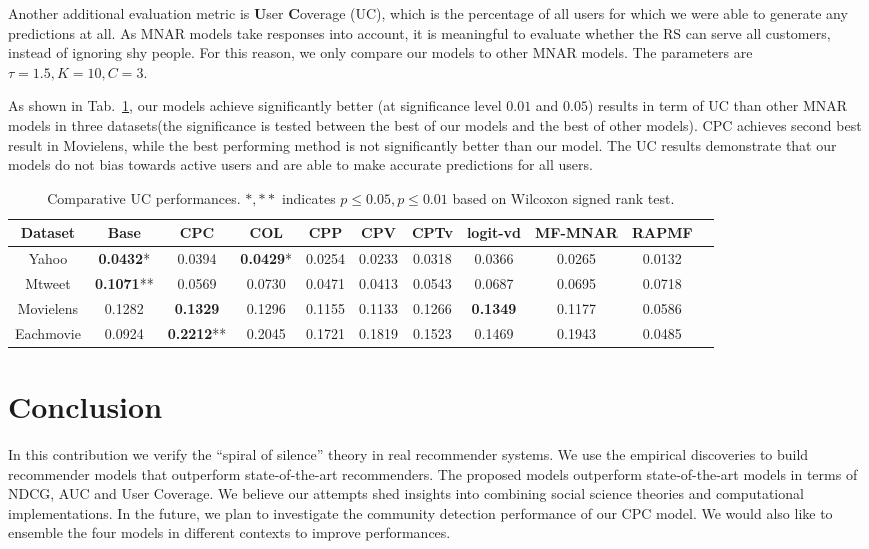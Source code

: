 \documentclass[sigconf]{acmart}
\begin{document}
Another additional evaluation metric is \textbf{U}ser \textbf{C}overage (UC), which is the percentage of all users for which we were able to generate any predictions at all. As MNAR models take responses into account, it is meaningful to evaluate whether the RS can serve all customers, instead of ignoring shy people. For this reason, we only compare our models to other MNAR models. The parameters are  $\tau = 1.5, K=10, C=3$.

As shown in Tab.~\ref{tab:uc}, our models achieve significantly better (at significance level $0.01$ and $0.05$) results in term of UC than other MNAR models in three datasets(the significance is tested between the best of our models and the best of other models). CPC achieves second best result in Movielens, while the best performing method is not significantly better than our model. The UC results demonstrate that our models do not bias towards active users and are able to make accurate predictions for all users.

\begin{table}[tbp]
\centering
\caption{Comparative UC performances. $*,**$ indicates $p\leq 0.05,p\leq 0.01$ based on Wilcoxon signed rank test.}\label{tab:uc}
\centering
\small
\begin{tabular}{|c|c|c|c|c|c|c|c|c|c|c|}
\hline
Dataset & Base & CPC	& COL&	CPP&	CPV&	CPTv	&logit-vd&	MF-MNAR&	RAPMF\\\hline
\hline
Yahoo	& \textbf{0.0432}* &0.0394 	&\textbf{0.0429}*&	0.0254 &	0.0233 &	0.0318 &	0.0366 	&0.0265 	&0.0132\\\hline 
Mtweet&	\textbf{0.1071}** &0.0569 &	0.0730 	&0.0471 	&0.0413 &	0.0543 &	0.0687 &	0.0695 &	0.0718 \\\hline 
Movielens	&0.1282 & \textbf{0.1329} 	&0.1296 &	0.1155 &	0.1133 &	0.1266 	&\textbf{0.1349} &	0.1177 &	0.0586 \\\hline 
Eachmovie&	0.0924  &\textbf{0.2212}**	&0.2045 &	0.1721 &	0.1819 	&0.1523 	&0.1469& 	0.1943 &	0.0485\\\hline 
 \end{tabular}\label{tab:uc}
\end{table}

\section{Conclusion}\label{sec:conclusion}

In this contribution we verify the ``spiral of silence'' theory in real recommender systems. We use the empirical discoveries to build recommender models that outperform state-of-the-art recommenders. The proposed models outperform state-of-the-art models in terms of NDCG, AUC and User Coverage. We believe our attempts shed insights into combining social science theories and computational implementations. In the future, we plan to investigate the community detection performance of our CPC model. We would also like to ensemble the four models in different contexts to improve performances.
\end{document}
